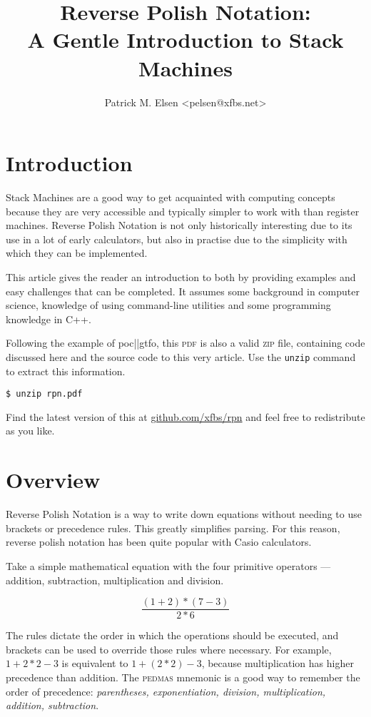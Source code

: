 \documentclass[a4paper,twocolumn]{article}
\title{Reverse Polish Notation:\\A Gentle Introduction to Stack Machines}
\author{Patrick M. Elsen <pelsen@xfbs.net>}
\date{}
\begin{document}
\maketitle
\tableofcontents

\section*{Introduction}

Stack Machines are a good way to get acquainted with computing concepts because they are very accessible and typically simpler to work with than register machines. Reverse Polish Notation is not only historically interesting due to its use in a lot of early calculators, but also in practise due to the simplicity with which they can be implemented.

This article gives the reader an introduction to both by providing examples and easy challenges that can be completed. It assumes some background in computer science, knowledge of using command-line utilities and some programming knowledge in C++.

Following the example of  poc||gtfo, this \textsc{pdf} is also a valid \textsc{zip} file, containing code discussed here and the source code to this very article. Use the \verb|unzip| command to extract this information.

\begin{verbatim}
$ unzip rpn.pdf
\end{verbatim}

Find the latest version of this at \href{https://github.com/xfbs/rpn}{github.com/xfbs/rpn} and feel free to redistribute as you like.

\section{Overview}

Reverse Polish Notation is a way to write down equations without needing to use brackets or precedence rules. This greatly simplifies parsing. For this reason, reverse polish notation has been quite popular with Casio calculators.

Take a simple mathematical equation with the four primitive operators — addition, subtraction, multiplication and division.

\begin{equation}
  \frac{(1 + 2) * (7 - 3)}{2 * 6}
\end{equation}

The rules dictate the order in which the operations should be executed, and brackets can be used to override those rules where necessary. For example, $1 + 2 * 2 - 3$ is equivalent to $1 + (2 * 2) - 3$, because multiplication has higher precedence than addition. The \textsc{pedmas} mnemonic is a good way to remember the order of precedence: \emph{parentheses, exponentiation, division, multiplication, addition, subtraction}. 
\end{document}
